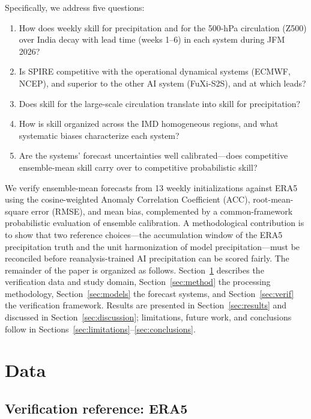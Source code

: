 \documentclass[11pt]{article}
\begin{document}
Specifically, we address five questions:
\begin{enumerate}
  \item How does weekly skill for precipitation and for the 500-hPa
        circulation (Z500) over India decay with lead time (weeks 1--6)
        in each system during JFM 2026?
  \item Is SPIRE competitive with the operational dynamical systems
        (ECMWF, NCEP), and superior to the other AI system (FuXi-S2S),
        and at which leads?
  \item Does skill for the large-scale circulation translate into skill
        for precipitation?
  \item How is skill organized across the IMD homogeneous regions, and
        what systematic biases characterize each system?
  \item Are the systems' forecast uncertainties well calibrated---does
        competitive ensemble-mean skill carry over to competitive
        probabilistic skill?
\end{enumerate}
We verify ensemble-mean forecasts from 13 weekly initializations against
ERA5 using the cosine-weighted Anomaly Correlation Coefficient (ACC),
root-mean-square error (RMSE), and mean bias, complemented by a
common-framework probabilistic evaluation of ensemble calibration. A
methodological contribution is to show that two reference choices---the
accumulation window of the ERA5 precipitation truth and the unit
harmonization of model precipitation---must be reconciled before
reanalysis-trained AI precipitation can be scored fairly. The remainder
of the paper is organized as follows. Section~\ref{sec:data} describes the
verification data and study domain, Section~\ref{sec:method} the
processing methodology, Section~\ref{sec:models} the forecast systems,
and Section~\ref{sec:verif} the verification framework. Results are
presented in Section~\ref{sec:results} and discussed in
Section~\ref{sec:discussion}; limitations, future work, and conclusions
follow in Sections~\ref{sec:limitations}--\ref{sec:conclusions}.

\section{Data}\label{sec:data}

\subsection{Verification reference: ERA5}\label{sec:era5}
\end{document}
